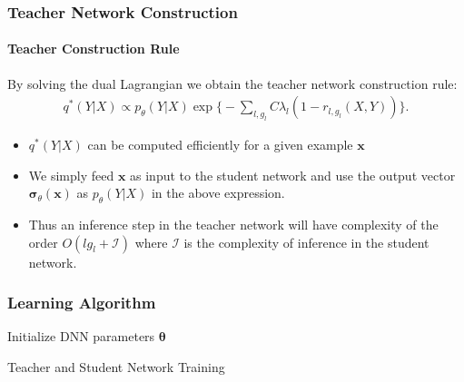 \documentclass{beamer}
\begin{document}
\begin{frame}
\frametitle{Teacher Network Construction}
\framesubtitle{Teacher Construction Rule}
By solving the dual Lagrangian we obtain the teacher network construction rule:
\begin{gather}
q^*(Y|X) \propto p_\theta(Y|X) \exp\bigg \{ -\sum_{l,g_l}C \lambda_l (1 - r_{l,g_l}(X, Y)) \bigg \}.
\end{gather}
\begin{itemize}
	\item $q^*(Y|X)$ can be computed efficiently for a given example $\textbf{x}$
	\item We simply feed $\textbf{x}$ as input to the student network and use the output vector $\boldsymbol{\sigma}_{\theta}(\textbf{x})$ as $p_\theta(Y|X)$ in the above expression.
	\item Thus an inference step in the teacher network will have complexity of the order $O(lg_l + \mathcal{I})$ where $ \mathcal{I}$ is the complexity of inference in the student network.
\end{itemize}
\end{frame}

\begin{frame}
\frametitle{Learning Algorithm}
\begin{algorithm}[H]
Initialize DNN parameters $\boldsymbol{\theta}$ \\
\caption{Teacher and Student Network Training}
\end{algorithm}
\end{frame}
\end{document}
